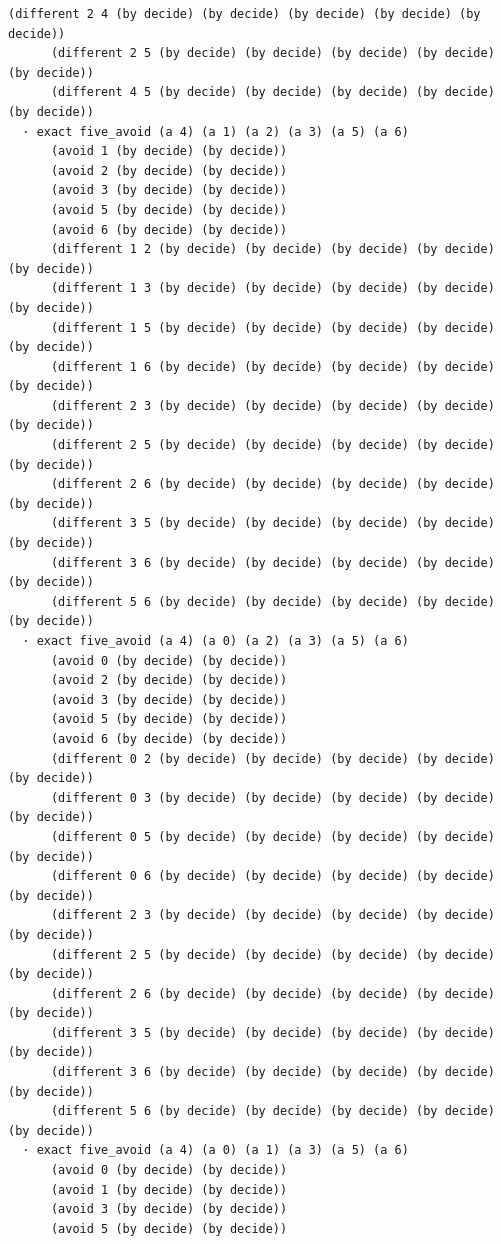 \documentclass[11pt,a4paper]{article}
\begin{document}
\begin{Verbatim}[breaklines,breakanywhere,fontsize=\footnotesize]
      (different 2 4 (by decide) (by decide) (by decide) (by decide) (by decide))
      (different 2 5 (by decide) (by decide) (by decide) (by decide) (by decide))
      (different 4 5 (by decide) (by decide) (by decide) (by decide) (by decide))
  · exact five_avoid (a 4) (a 1) (a 2) (a 3) (a 5) (a 6)
      (avoid 1 (by decide) (by decide))
      (avoid 2 (by decide) (by decide))
      (avoid 3 (by decide) (by decide))
      (avoid 5 (by decide) (by decide))
      (avoid 6 (by decide) (by decide))
      (different 1 2 (by decide) (by decide) (by decide) (by decide) (by decide))
      (different 1 3 (by decide) (by decide) (by decide) (by decide) (by decide))
      (different 1 5 (by decide) (by decide) (by decide) (by decide) (by decide))
      (different 1 6 (by decide) (by decide) (by decide) (by decide) (by decide))
      (different 2 3 (by decide) (by decide) (by decide) (by decide) (by decide))
      (different 2 5 (by decide) (by decide) (by decide) (by decide) (by decide))
      (different 2 6 (by decide) (by decide) (by decide) (by decide) (by decide))
      (different 3 5 (by decide) (by decide) (by decide) (by decide) (by decide))
      (different 3 6 (by decide) (by decide) (by decide) (by decide) (by decide))
      (different 5 6 (by decide) (by decide) (by decide) (by decide) (by decide))
  · exact five_avoid (a 4) (a 0) (a 2) (a 3) (a 5) (a 6)
      (avoid 0 (by decide) (by decide))
      (avoid 2 (by decide) (by decide))
      (avoid 3 (by decide) (by decide))
      (avoid 5 (by decide) (by decide))
      (avoid 6 (by decide) (by decide))
      (different 0 2 (by decide) (by decide) (by decide) (by decide) (by decide))
      (different 0 3 (by decide) (by decide) (by decide) (by decide) (by decide))
      (different 0 5 (by decide) (by decide) (by decide) (by decide) (by decide))
      (different 0 6 (by decide) (by decide) (by decide) (by decide) (by decide))
      (different 2 3 (by decide) (by decide) (by decide) (by decide) (by decide))
      (different 2 5 (by decide) (by decide) (by decide) (by decide) (by decide))
      (different 2 6 (by decide) (by decide) (by decide) (by decide) (by decide))
      (different 3 5 (by decide) (by decide) (by decide) (by decide) (by decide))
      (different 3 6 (by decide) (by decide) (by decide) (by decide) (by decide))
      (different 5 6 (by decide) (by decide) (by decide) (by decide) (by decide))
  · exact five_avoid (a 4) (a 0) (a 1) (a 3) (a 5) (a 6)
      (avoid 0 (by decide) (by decide))
      (avoid 1 (by decide) (by decide))
      (avoid 3 (by decide) (by decide))
      (avoid 5 (by decide) (by decide))

\end{Verbatim}
\end{document}
